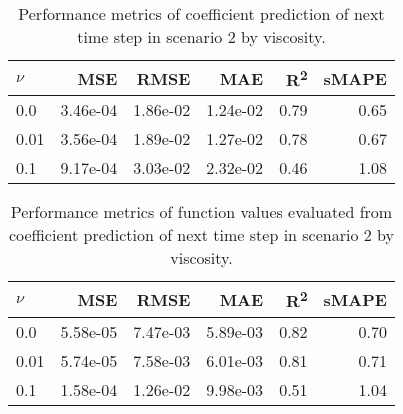 \begin{table}[H]
  \caption{Performance metrics of coefficient prediction of next time step in scenario 2 by viscosity.}\label{table:scenario_2_spectral_metrics}
  \centering
  \begin{tabular}{lrrrrr}
    \toprule
    \(\nu \) & MSE      & RMSE     & MAE      & R\textsuperscript{2}   & sMAPE \\
    \midrule
    0.0      & 3.46e-04 & 1.86e-02 & 1.24e-02 & 0.79 & 0.65  \\
    0.01     & 3.56e-04 & 1.89e-02 & 1.27e-02 & 0.78 & 0.67  \\
    0.1      & 9.17e-04 & 3.03e-02 & 2.32e-02 & 0.46 & 1.08  \\
    \bottomrule
  \end{tabular}
\end{table}

\begin{table}[H]
  \caption{Performance metrics of function values evaluated from coefficient prediction of next time step in scenario 2 by viscosity.}\label{table:scenario_2_function_metrics}
  \centering
  \begin{tabular}{lrrrrr}
    \toprule
    \(\nu \) & MSE      & RMSE     & MAE      & R\textsuperscript{2}   & sMAPE \\
    \midrule
    0.0      & 5.58e-05 & 7.47e-03 & 5.89e-03 & 0.82 & 0.70  \\
    0.01     & 5.74e-05 & 7.58e-03 & 6.01e-03 & 0.81 & 0.71  \\
    0.1      & 1.58e-04 & 1.26e-02 & 9.98e-03 & 0.51 & 1.04  \\
    \bottomrule
  \end{tabular}
\end{table}

